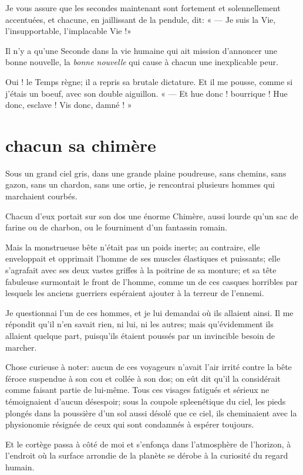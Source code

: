 Je vous assure que les secondes maintenant sont fortement et
solennellement accentuées, et chacune, en jaillissant de la pendule,
dit: « --- Je suis la Vie, l’insupportable,
l’implacable Vie !»

Il n’y a qu’une Seconde dans la vie
humaine qui ait mission d’annoncer une bonne nouvelle,
la \textit{bonne nouvelle} qui cause à chacun une inexplicable peur.

Oui ! le Temps règne; il a repris sa brutale dictature. Et il me pousse, 
comme si j’étais un boeuf, avec son double aiguillon. 
« --- Et hue donc ! bourrique ! Hue donc, esclave ! Vis donc, damné ! » 


\quebra\section[Chacun sa chimère]{chacun sa chimère }

Sous un grand ciel gris, dans une grande plaine poudreuse, sans chemins,
sans gazon, sans un chardon, sans une ortie, je rencontrai plusieurs
hommes qui marchaient courbés.

Chacun d’eux portait sur son dos une énorme Chimère,
aussi lourde qu’un sac de farine ou de charbon, ou le
fourniment d’un fantassin romain.

Mais la monstrueuse bête n’était pas un poids inerte;
au contraire, elle enveloppait et opprimait l’homme de
ses muscles élastiques et puissants; elle s’agrafait
avec ses deux vastes griffes à la poitrine de sa monture; et sa tête
fabuleuse surmontait le front de l’homme, comme un de
ces casques horribles par lesquels les anciens guerriers espéraient
ajouter à la terreur de l’ennemi.

Je questionnai l’un de ces hommes, et je lui demandai
où ils allaient ainsi. Il me répondit qu’il
n’en savait rien, ni lui, ni les autres; mais
qu’évidemment ils allaient quelque part,
puisqu’ils étaient poussés par un invincible besoin de
marcher.

Chose curieuse à noter: aucun de ces voyageurs n’avait
l’air irrité contre la bête féroce suspendue à son cou
et collée à son dos; on eût dit qu’il la considérait
comme faisant partie de lui{}-même. Tous ces visages fatigués et
sérieux ne témoignaient d’aucun désespoir; sous la
coupole spleenétique du ciel, les pieds plongés dans la poussière
d’un sol aussi désolé que ce ciel, ils cheminaient
avec la physionomie résignée de ceux qui sont condamnés à espérer
toujours.

Et le cortège passa à côté de moi et s’enfonça dans
l’atmosphère de l’horizon, à
l’endroit où la surface arrondie de la planète se
dérobe à la curiosité du regard humain.


